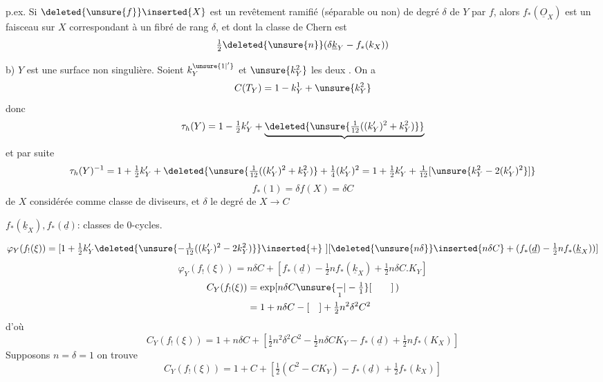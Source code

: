 
p.ex. Si \(\deleted{\unsure{f}}\inserted{X}\) est un revêtement ramifié (séparable ou non) de degré \(\delta\) de \(Y\) par \(f\), alors \(f_*(\underline O_X)\) est un  faisceau sur \(X\) correspondant à un fibré  de  rang \(\delta\), et dont la classe de Chern est
\[
\tfrac12\deleted{\unsure{n}}(\delta\underline k_Y-f_*(k_X))
\]

b) \(Y\) est une surface non singulière. Soient \(k_Y^{\unsure{1|' }}\) et \(\unsure{k_Y^2}\) les deux  . On a
\[
C(T_Y)=1-k_Y^1+\unsure{k_Y^2}
\]
donc
\[
\tau_h(Y)=1-\tfrac12k'_Y+\underbrace{\deleted{\unsure{\tfrac1{12}((k'_Y)^2+k_Y^2)}}}
\]
et par suite
\[
\tau_h(Y)^{-1}=1+\tfrac12k'_Y+\deleted{\unsure{\tfrac1{12}((k'_Y)^2+k_Y^2)}+\tfrac14(k'_Y)^2=1+\tfrac12k'_Y+\tfrac1{12}[\unsure{k_Y^2-2(k'_Y)^2}]}
\]
\[
f_*(1)=\delta f(X)=\delta C
\]
 de \(X\) considérée comme classe de diviseurs, et \(\delta\) le degré de \(X\to C\)

\(f_*(\underline k_X),f_*(\underline d)\): classes de \(0\)-cycles.

\[
\varphi_Y(f_!(\xi))=[1+\tfrac12k'_Y\deleted{\unsure{-\tfrac1{12}((k'_Y)^2-2k_Y^2)}}\inserted{+}\ ][\deleted{\unsure{n\delta}}\inserted{n\delta C}+(f_*(\underline d)-\tfrac12n f_*(\underline k_X))]
\]
\[
\boxed{\varphi_Y(f_!(\xi))=n\delta C+\left[f_*(\underline d)-\tfrac12n f_*(\underline k_X)+\tfrac12n\delta C.K_Y\right]}
\]
\[
\begin{aligned}
C_Y(f_!(\xi))&=\exp[n\delta C\unsure{\underset{1}{-}|-\tfrac11}[\qquad]\,)\\
&=1+n\delta C-[\quad]+\tfrac12n^2\delta^2C^2
\end{aligned}
\]
d'où
\[
\boxed{C_Y(f_!(\xi))=1+n\delta C+\left[\tfrac12n^2\delta^2C^2-\tfrac12n\delta C K_Y-f_*(\underline d)+\tfrac12n f_*(K_X)\right]}
\]
Supposons \(n=\delta=1\)  on trouve
\[
C_Y(f_!(\xi))=1+C+\left[\tfrac12(C^2-CK_Y)-f_*(\underline d)+\tfrac12f_*(k_X)\right]
\]

